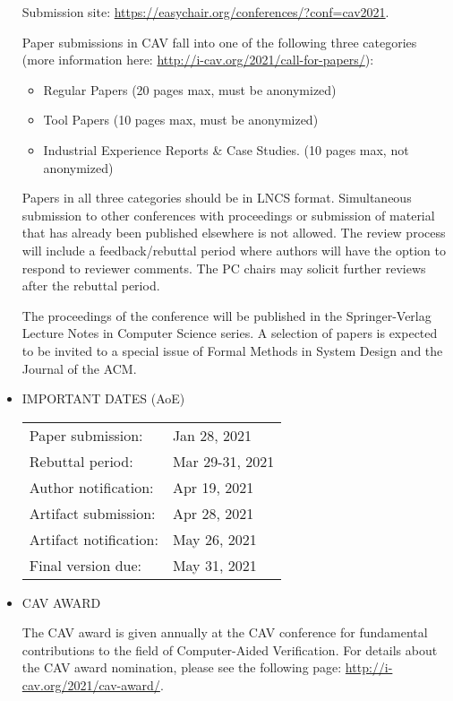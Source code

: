 \documentclass{article}
\begin{document}
\begin{itemize}
  Submission site: \href{https://easychair.org/conferences/?conf=cav2021}{https://easychair.org/conferences/?conf=cav2021}.  
 
  Paper submissions in CAV fall into one of the following three categories (more information here: \href{http://i-cav.org/2021/call-for-papers/}{http://i-cav.org/2021/call-for-papers/}): 
 
\begin{itemize}\item  Regular Papers (20 pages max, must be anonymized)
\item  Tool Papers  (10 pages max, must be anonymized)
\item  Industrial Experience Reports \& Case Studies. (10 pages max, not anonymized)
\end{itemize} 
  Papers in all three categories should be in LNCS format. Simultaneous submission to other conferences with proceedings or submission of material that has already been published elsewhere is not allowed. The review process will include a feedback/rebuttal period where authors will have the option to respond to reviewer comments. The PC chairs may solicit further reviews after the rebuttal period.  
 
  The proceedings of the conference will be published in the Springer-Verlag Lecture Notes in Computer Science series. A selection of papers is expected to be invited to a special issue of Formal Methods in System Design and the Journal of the ACM. 
 
\item  IMPORTANT DATES (AoE) 
 
\begin{tabulary}{\linewidth}{LL}Paper submission:  & Jan 28, 2021 \\
Rebuttal period:  & Mar 29-31, 2021 \\
Author notification:  & Apr 19, 2021 \\
Artifact submission:  & Apr 28, 2021 \\
Artifact notification:  & May 26, 2021 \\
Final version due:  & May 31, 2021 \\
\end{tabulary}
 
\item  CAV AWARD  
 
  The CAV award is given annually at the CAV conference for fundamental contributions to  the field of Computer-Aided Verification. For details about the CAV award nomination,  please see the following page: \href{http://i-cav.org/2021/cav-award/}{http://i-cav.org/2021/cav-award/}. 
 

\end{itemize}
\end{document}
